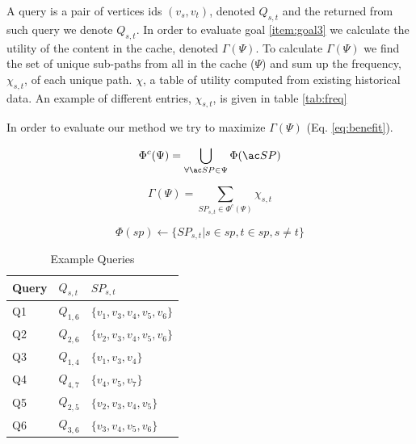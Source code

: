 A query is a pair of vertices ids $(v_s, v_t)$, denoted $Q_{s,t}$ and the \spath returned from such query we denote $Q_{s,t}$. 
In order to evaluate goal \ref{item:goal3} we calculate the utility of the content in the cache, denoted $\Gamma(\Psi)$. To calculate $\Gamma(\Psi)$ we find the set of unique sub-paths from all \spaths in the cache ($\Psi$) and sum up the frequency, $\chi_{s,t}$, of each unique path.
$\chi$, a table of utility computed from existing historical data. An example of different entries, $\chi_{s,t}$, is given in table \ref{tab:freq}

In order to evaluate our method we try to maximize $\Gamma(\Psi)$ (Eq. \ref{eq:benefit}).



\begin{equation} \label{eq:upsi}
 \Phi^c(\Psi) = \bigcup\limits_{\forall \spath \in \Psi} \Phi(\spath)
\end{equation}

\begin{equation} \label{eq:benefit}
\Gamma(\Psi) = \sum\limits_{SP_{s,t} \in \Phi^c(\Psi)} \chi_{s,t}
\end{equation}

\begin{equation} \label{eq:phi}
\Phi(sp) \leftarrow \{ SP_{s,t} | s \in sp, t \in sp, s \neq t\}
\end{equation}

\begin{table}
\center
\begin{tabular}{|l|l|l|}\hline
Query	&	$Q_{s,t}$	& $SP_{s,t}$ \\\hline 
Q1	&	$Q_{1,6}$ 	& $\{v_1,v_3,v_4,v_5,v_6\}$\\
Q2	&	$Q_{2,6}$ 	& $\{v_2,v_3,v_4,v_5,v_6\}$ \\
Q3	&	$Q_{1,4}$ 	& $\{v_1,v_3,v_4\}$ \\
Q4	&	$Q_{4,7}$ 	& $\{v_4,v_5,v_7\}$ \\
Q5	&	$Q_{2,5}$ 	& $\{v_2,v_3,v_4,v_5\}$ \\
Q6	&	$Q_{3,6}$ 	& $\{v_3,v_4,v_5,v_6\}$ \\\hline
\end{tabular}
\caption{Example Queries}
\label{tab:queries}
\end{table}


